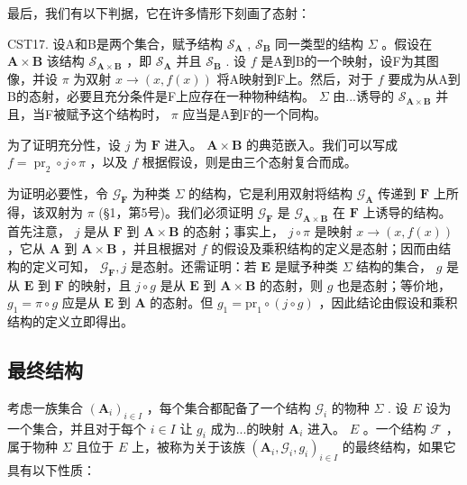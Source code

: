 最后，我们有以下判据，它在许多情形下刻画了态射：

CST17. 设A和B是两个集合，赋予结构 \(\mathcal{S}_{\mathbf{A}}\) , \(\mathcal{S}_{\mathbf{B}}\) 同一类型的结构 \(\Sigma\) 。假设在 \(\mathbf{A} \times \mathbf{B}\) 该结构 \(\mathcal{S}_{\mathbf{A} \times \mathbf{B}}\) ，即 \(\mathcal{S}_{\mathbf{A}}\) 并且 \(\mathcal{S}_{\mathbf{B}}\) . 设 \(f\) 是A到B的一个映射，设F为其图像，并设 \(\pi\) 为双射 \(x \to (x, f(x))\) 将A映射到F上。然后，对于 \(f\) 要成为从A到B的态射，必要且充分条件是F上应存在一种物种结构。 \(\Sigma\) 由...诱导的 \(\mathcal{S}_{\mathbf{A} \times \mathbf{B}}\) 并且，当F被赋予这个结构时， \(\pi\) 应当是A到F的一个同构。

为了证明充分性，设 \(j\) 为 \(\mathbf{F}\) 进入。 \(\mathbf{A} \times \mathbf{B}\) 的典范嵌入。我们可以写成 \(f = \operatorname{pr}_2 \circ j \circ \pi\) ，以及 \(f\) 根据假设，则是由三个态射复合而成。

为证明必要性，令 \(\mathcal{G}_{\mathbf{F}}\) 为种类 \(\Sigma\) 的结构，它是利用双射将结构 \(\mathcal{G}_{\mathbf{A}}\) 传递到 \(\mathbf{F}\) 上所得，该双射为 \(\pi\) (§1，第5号)。我们必须证明 \(\mathcal{G}_{\mathbf{F}}\) 是 \(\mathcal{G}_{\mathbf{A} \times \mathbf{B}}\) 在 \(\mathbf{F}\) 上诱导的结构。首先注意， \(j\) 是从 \(\mathbf{F}\) 到 \(\mathbf{A} \times \mathbf{B}\) 的态射；事实上， \(j \circ \pi\) 是映射 \(x \to (x, f(x))\) ，它从 \(\mathbf{A}\) 到 \(\mathbf{A} \times \mathbf{B}\) ，并且根据对 \(f\) 的假设及乘积结构的定义是态射；因而由结构的定义可知， \(\mathcal{G}_{\mathbf{F}}, j\) 是态射。还需证明：若 \(\mathbf{E}\) 是赋予种类 \(\Sigma\) 结构的集合， \(g\) 是从 \(\mathbf{E}\) 到 \(\mathbf{F}\) 的映射，且 \(j \circ g\) 是从 \(\mathbf{E}\) 到 \(\mathbf{A} \times \mathbf{B}\) 的态射，则 \(g\) 也是态射；等价地， \(g_{1} = \pi \circ g\) 应是从 \(\mathbf{E}\) 到 \(\mathbf{A}\) 的态射。但 \(g_{1} = \mathrm{pr}_{1} \circ (j \circ g)\) ，因此结论由假设和乘积结构的定义立即得出。

\subsection{最终结构}

考虑一族集合 \((\mathbf{A}_{i})_{i\in I}\) ，每个集合都配备了一个结构 \(\mathcal{G}_i\) 的物种 \(\Sigma\) . 设 \(E\) 设为一个集合，并且对于每个 \(i\in I\) 让 \(g_i\) 成为...的映射 \(\mathbf{A}_i\) 进入。 \(E\) 。一个结构 \(\mathcal{F}\) ，属于物种 \(\Sigma\) 且位于 \(E\) 上，被称为关于该族 \((\mathbf{A}_i,\mathcal{G}_i,g_i)_{i\in I}\) 的最终结构，如果它具有以下性质：

